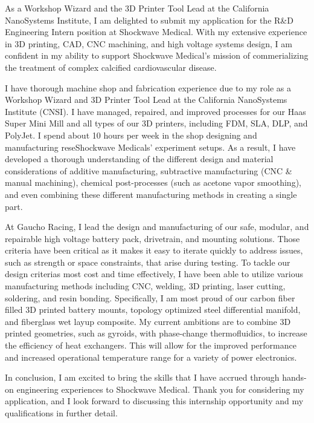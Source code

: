 \documentclass[11pt, letterpaper]{awesome-cv} %
\begin{document}
\makecvheader %

\makelettertitle %


\begin{cvletter}


As a Workshop Wizard and the 3D Printer Tool Lead at the California NanoSystems Institute, I am delighted to submit my application for the R\&D Engineering Intern position at Shockwave Medical. With my extensive experience in 3D printing, CAD, CNC machining, and high voltage systems design, I am confident in my ability to support Shockwave Medical's mission of commerializing the treatment of complex calcified cardiovascular disease.

I have thorough machine shop and fabrication experience due to my role as a Workshop Wizard and 3D Printer Tool Lead at the California NanoSystems Institute (CNSI). I have managed, repaired, and improved processes for our Haas Super Mini Mill and all types of our 3D printers, including FDM, SLA, DLP, and PolyJet. I spend about 10 hours per week in the shop designing and manufacturing reseShockwave Medicals' experiment setups. As a result, I have developed a thorough understanding of the different design and material considerations of additive manufacturing, subtractive manufacturing (CNC \& manual machining), chemical post-processes (such as acetone vapor smoothing), and even combining these different manufacturing methods in creating a single part.

At Gaucho Racing, I lead the design and manufacturing of our safe, modular, and repairable high voltage battery pack, drivetrain, and mounting solutions. Those criteria have been critical as it makes it easy to iterate quickly to address issues, such as strength or space constraints, that arise during testing. To tackle our design criterias most cost and time effectively, I have been able to utilize various manufacturing methods including CNC, welding, 3D printing, laser cutting, soldering, and resin bonding. Specifically, I am most proud of our carbon fiber filled 3D printed battery mounts, topology optimized steel differential manifold, and fiberglass wet layup composite. My current ambitions are to combine 3D printed geometries, such as gyroids, with phase-change thermofluidics, to increase the efficiency of heat exchangers. This will allow for the improved performance and increased operational temperature range for a variety of power electronics.

In conclusion, I am excited to bring the skills that I have accrued through hands-on engineering experiences to Shockwave Medical. Thank you for considering my application, and I look forward to discussing this internship opportunity and my qualifications in further detail.


\end{cvletter}


\makeletterclosing %
\end{document}
